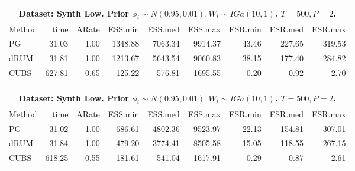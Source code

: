 \documentclass[11pt]{article}
\begin{document}
\begin{table}
\begin{tabular}{l r r r r r r r r } 
\hline
\multicolumn{9}{c}{ Dataset: Synth Low. Prior $\phi_i \sim N(0.95, 0.01), W_i
  \sim IGa(10, 1)$.  $T=500, P=2$.} \\
\hline
          Method  &     time &    ARate &  ESS.min &  ESS.med &  ESS.max &  ESR.min &  ESR.med &  ESR.max \\ 
              PG  &    31.03 &     1.00 &  1348.88 &  7063.34 &  9914.37 &    43.46 &   227.65 &   319.53 \\ 
            dRUM  &    31.81 &     1.00 &  1213.67 &  5643.54 &  9060.83 &    38.15 &   177.40 &   284.82 \\ 
            CUBS  &   627.81 &     0.65 &   125.22 &   576.81 &  1695.55 &     0.20 &     0.92 &     2.70
 \end{tabular}

\begin{tabular}{l r r r r r r r r } 
\hline
\multicolumn{9}{c}{Dataset: Synth Low. Prior $\phi_i \sim N(0.95, 0.01), W_i \sim IGa(10, 1)$.  $T=500, P=2$.} \\
\hline
          Method  &     time &    ARate &  ESS.min &  ESS.med &  ESS.max &  ESR.min &  ESR.med &  ESR.max \\ 
              PG  &    31.02 &     1.00 &   686.61 &  4802.36 &  9523.97 &    22.13 &   154.81 &   307.01 \\ 
            dRUM  &    31.84 &     1.00 &   479.20 &  3774.41 &  8505.58 &    15.05 &   118.55 &   267.15 \\ 
            CUBS  &   618.25 &     0.55 &   181.61 &   541.04 &  1617.91 &     0.29 &     0.87 &     2.61
 \end{tabular}



\end{table}
\end{document}
